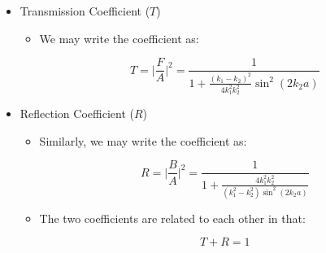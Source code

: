 \begin{itemize}
\begin{itemize}
    \end{itemize}

  \item Transmission Coefficient ($T$)

    \begin{itemize}

      \item We may write the coefficient as:

        $$T=\Big|\frac{F}{A}\Big|^2=\frac{1}{1+\frac{(k_1-k_2)^2}{4k_1^2k_2^2}\sin^2(2k_2a)}$$

    \end{itemize}

  \item Reflection Coefficient ($R$)

    \begin{itemize}

      \item Similarly, we may write the coefficient as:

        $$R=\Big|\frac{B}{A}\Big|^2=\frac{1}{1+\frac{4k_1^2k_2^2}{(k_1^2-k_2^2)\sin^2(2k_2a)}}$$

      \item The two coefficients are related to each other in that:

        $$T+R=1$$

    \end{itemize}

\end{itemize}



